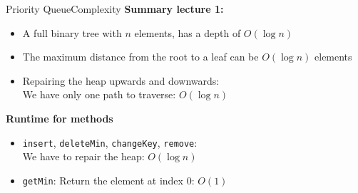 \begin{frame}{Priority Queue}{Complexity}
  \textbf{Summary lecture 1:}
  \begin{itemize}
    \item<2->
      A full binary tree with {\color{Mittel-Blau}$n$} elements, has a {\color{Mittel-Blau}depth} of
      {\color{Mittel-Blau}$O(\log n)$}
    \item<3->
      The maximum distance from the root to a leaf can be
      $O(\log n)$ elements
    \item<4->
      Repairing the heap upwards and downwards:\\
      We have only one path to traverse: {\color{Mittel-Blau}$O(\log n)$}
  \end{itemize}
  \textbf{Runtime for methods}
  \begin{itemize}
    \item<6->
      {\color{Mittel-Blau}\texttt{insert}},
      {\color{Mittel-Blau}\texttt{deleteMin}},
      {\color{Mittel-Blau}\texttt{changeKey}},
      {\color{Mittel-Blau}\texttt{remove}}:\\
      We have to repair the heap: {\color{Mittel-Blau}$O(\log n)$}
    \item<7->
      {\color{Mittel-Blau}\texttt{getMin}}:
      Return the element at index 0: {\color{Mittel-Blau}$O(1)$}
  \end{itemize}
\end{frame}


